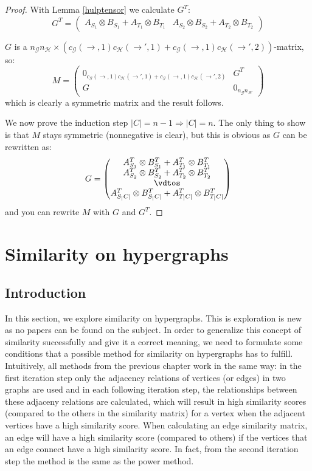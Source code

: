 \documentclass[a4paper,11pt]{report}
\newcommand{\graf}{\mathscr{G}}
\newcommand{\grafeen}{\mathscr{H}}
\begin{document}
\begin{proof}
With Lemma \ref{hulptensor} we calculate $G^T$:
$$G^T = \begin{pmatrix}
A_{S_1} \otimes  B_{S_1} + A_{T_1} \otimes B_{T_1} &
A_{S_2} \otimes  B_{S_2} + A_{T_2} \otimes B_{T_2}
\end{pmatrix}$$

$G$ is a $n_\graf n_\grafeen \times (c_\graf(\to,1)c_\grafeen(\to',1)+c_\graf(\to,1)c_\grafeen(\to',2))$-matrix, so:
$$ M = \begin{pmatrix}
0_{c_\graf(\to,1)c_\grafeen(\to',1)+c_\graf(\to,1)c_\grafeen(\to',2)}& G^T\\
G & 0_{n_\graf n_\grafeen}
\end{pmatrix}$$
which is clearly a symmetric matrix and the result follows.

We now prove the induction step $|C|=n-1 \Rightarrow |C|=n$. The only thing to 
show is that $M$ stays symmetric (nonnegative is clear), but this is obvious as $G$ can be rewritten 
as:
$$G = \begin{pmatrix}
A^T_{S_1} \otimes  B^T_{S_1} + A^T_{T_1} \otimes B^T_{T_1}\\
A^T_{S_2} \otimes  B^T_{S_2} + A^T_{T_2} \otimes B^T_{T_2}\\
\vdtos\\
A^T_{S_|C|} \otimes  B^T_{S_|C|} + A^T_{T_|C|} \otimes B^T_{T_|C|}
\end{pmatrix}$$
and you can rewrite $M$ with $G$ and $G^T$.



\end{proof}
\chapter{Similarity on hypergraphs}
\section{Introduction}
In this section, we explore similarity on hypergraphs. This is exploration is new as no papers can be found on the subject. In order to generalize
this concept of similarity successfully and give it a correct meaning, we need to formulate 
some conditions that a possible method for similarity on hypergraphs has to fulfill. 
Intuitively, all methods from the previous chapter work in the same way: in the 
first iteration step only the adjacency relations of vertices (or edges) in two graphs are 
used and in each following iteration step, the relationships between these 
adjaceny relations are calculated, which will result in high similarity scores (compared to the others in the similarity matrix)
for a vertex when the adjacent vertices have a high similarity score. When calculating an edge similarity matrix,
an edge will have a high similarity score (compared to others) if the vertices that an edge connect have a high similarity score.
 In fact, from the second iteration step the method is the same as the power method. 
 
\end{document}
